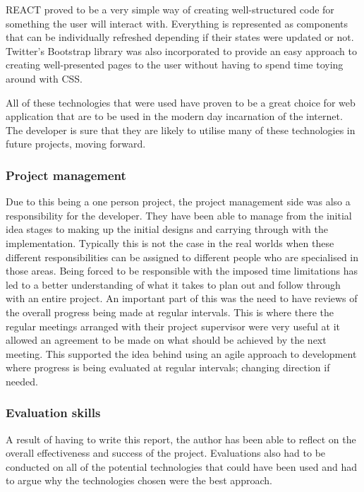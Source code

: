 REACT proved to be a very simple way of creating well-structured code for something the user will interact with.
Everything is represented as components that can be individually refreshed depending if their states were updated or not.
Twitter's Bootstrap library was also incorporated to provide an easy approach to creating well-presented pages to the user without having to spend time
toying around with CSS.

All of these technologies that were used have proven to be a great choice for web application that are to be used in the modern day incarnation of the
internet. 
The developer is sure that they are likely to utilise many of these technologies in future projects, moving forward.


\subsubsection*{Project management}
Due to this being a one person project, the project management side was also a responsibility for the developer.
They have been able to manage from the initial idea stages to making up the initial designs and carrying through with the implementation.
Typically this is not the case in the real worlds when these different responsibilities can be assigned to different people who are specialised in 
those areas.
Being forced to be responsible with the imposed time limitations has led to a better understanding of what it takes to plan out and follow through
with an entire project.  
An important part of this was the need to have reviews of the overall progress being made at regular intervals.
This is where there the regular meetings arranged with their project supervisor were very useful at it allowed an agreement to be made on what should 
be achieved by the next meeting.
This supported the idea behind using an agile approach to development where progress is being evaluated at regular intervals; changing direction if 
needed.

\subsubsection*{Evaluation skills}
A result of having to write this report, the author has been able to reflect on the overall effectiveness and success of the project.
Evaluations also had to be conducted on all of the potential technologies that could have been used and had to argue why the technologies chosen 
were the best approach.